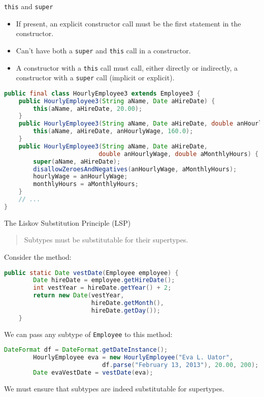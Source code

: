 \documentclass{beamer}
\begin{document}
\begin{frame}[fragile]{{\tt this} and {\tt super}}


\begin{itemize}
\item If present, an explicit constructor call must be the first statement in the constructor.
\item Can't have both a {\tt super} and {\tt this} call in a constructor.
\item A constructor with a {\tt this} call must call, either directly or indirectly, a constructor with a {\tt super} call (implicit or explicit).
\end{itemize}

\begin{lstlisting}[language=Java]
public final class HourlyEmployee3 extends Employee3 {
    public HourlyEmployee3(String aName, Date aHireDate) {
        this(aName, aHireDate, 20.00);
    }
    public HourlyEmployee3(String aName, Date aHireDate, double anHourlyWage) {
        this(aName, aHireDate, anHourlyWage, 160.0);
    }
    public HourlyEmployee3(String aName, Date aHireDate,
                          double anHourlyWage, double aMonthlyHours) {
        super(aName, aHireDate);
        disallowZeroesAndNegatives(anHourlyWage, aMonthlyHours);
        hourlyWage = anHourlyWage;
        monthlyHours = aMonthlyHours;
    }
    // ...
}
\end{lstlisting}


\end{frame}

\begin{frame}[fragile]{The Liskov Substitution Principle (LSP)}

\begin{quote}
Subtypes must be substitutable for their supertypes.
\end{quote}
Consider the method:
\begin{lstlisting}[language=Java]
    public static Date vestDate(Employee employee) {
        Date hireDate = employee.getHireDate();
        int vestYear = hireDate.getYear() + 2;
        return new Date(vestYear,
                        hireDate.getMonth(),
                        hireDate.getDay());
    }
\end{lstlisting}
We can pass any subtype of {\tt Employee} to this method:
\begin{lstlisting}[language=Java]
        DateFormat df = DateFormat.getDateInstance();
        HourlyEmployee eva = new HourlyEmployee("Eva L. Uator",
                           df.parse("February 13, 2013"), 20.00, 200);
        Date evaVestDate = vestDate(eva);
\end{lstlisting}

We must ensure that subtypes are indeed substitutable for supertypes.

\end{frame}
\end{document}
